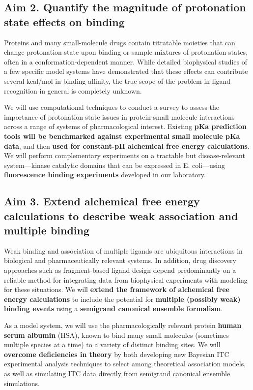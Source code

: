 \documentclass[10pt]{article}
\begin{document}
\subsection*{Aim 2. Quantify the magnitude of protonation state effects on binding}
Proteins and many small-molecule drugs contain titratable moieties that can change protonation state upon binding or sample mixtures of protonation states, often in a conformation-dependent manner.
While detailed biophysical studies of a few specific model systems have demonstrated that these effects can contribute several kcal/mol in binding affinity, the true scope of the problem in ligand recognition in general is completely unknown.

We will use computational techniques to conduct a survey to assess the importance of protonation state issues in protein-small molecule interactions across a range of systems of pharmacological interest.
Existing \textbf{ pKa prediction tools will be benchmarked against experimental small molecule pKa data}, and then \textbf{ used for constant-pH alchemical free energy calculations}.
We will perform complementary experiments on a tractable but disease-relevant system---kinase catalytic domains that can be expressed in E. coli---using \textbf{ fluorescence binding experiments } developed in our laboratory.

\subsection*{Aim 3. Extend alchemical free energy calculations to describe weak association and multiple binding}
Weak binding and association of multiple ligands are ubiquitous interactions in biological and pharmaceutically relevant systems.
In addition, drug discovery approaches such as fragment-based ligand design depend predominantly on a reliable method for integrating data from biophysical experiments with modeling for these situations.
We will \textbf{ extend the framework of alchemical free energy calculations}  to include the potential for \textbf{ multiple (possibly weak) binding events } using a \textbf{ semigrand canonical ensemble formalism}.

As a model system, we will use the pharmacologically relevant protein \textbf{ human serum albumin } (HSA), known to bind many small molecules (sometimes multiple species at a time) to a variety of distinct binding sites.
We will  \textbf{ overcome deficiencies in theory } by both developing new Bayesian ITC experimental analysis techniques to select among theoretical association models, as well as simulating ITC data directly from semigrand canonical ensemble simulations.
\end{document}
